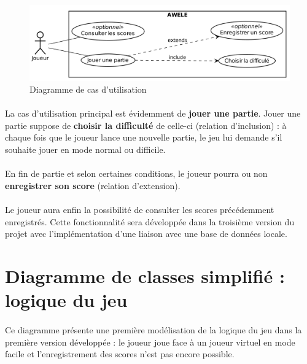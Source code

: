 \documentclass{article}
\begin{document}
    \begin{figure}[H]
        \centering
        \includegraphics[width=.75\linewidth]{./schemas/usecase.png}
        \caption{Diagramme de cas d'utilisation}
    \end{figure}

    \paragraph{}
    La cas d'utilisation principal est évidemment de \textbf{jouer une partie}. Jouer une partie suppose de \textbf{choisir la difficulté} de celle-ci (relation d'inclusion) : à chaque fois que le joueur lance une nouvelle partie, le jeu lui demande s'il souhaite jouer en mode normal ou difficile.

    \paragraph{}
    En fin de partie et selon certaines conditions, le  joueur pourra ou non \textbf{enregistrer son score} (relation d'extension).

    \paragraph{}
    Le joueur aura enfin la possibilité de consulter les scores précédemment enregistrés. Cette fonctionnalité sera développée dans la troisième version du projet avec l'implémentation d'une liaison avec une base de données locale.

    \newpage
    \section{Diagramme de classes simplifié : logique du jeu}
    \paragraph{}
    Ce diagramme présente une première modélisation de la logique du jeu dans la première version développée : le joueur joue face à un joueur virtuel en mode facile et l'enregistrement des scores n'est pas encore possible.
\end{document}
